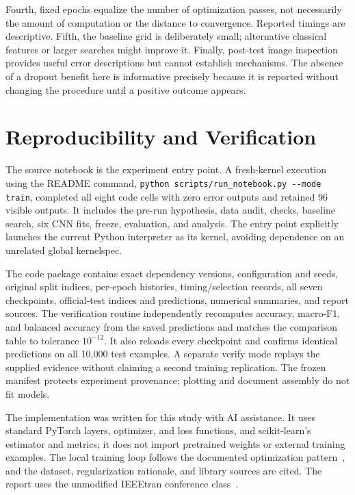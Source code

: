 \documentclass[conference]{IEEEtran}
\begin{document}
Fourth, fixed epochs equalize the number of optimization passes, not necessarily the amount of computation or the distance to convergence. Reported timings are descriptive. Fifth, the baseline grid is deliberately small; alternative classical features or larger searches might improve it. Finally, post-test image inspection provides useful error descriptions but cannot establish mechanisms. The absence of a dropout benefit here is informative precisely because it is reported without changing the procedure until a positive outcome appears.

\section{Reproducibility and Verification}
The source notebook is the experiment entry point. A fresh-kernel execution using the README command, \texttt{python scripts/run\_notebook.py -{}-mode train}, completed all eight code cells with zero error outputs and retained 96 visible outputs. It includes the pre-run hypothesis, data audit, checks, baseline search, six CNN fits, freeze, evaluation, and analysis. The entry point explicitly launches the current Python interpreter as its kernel, avoiding dependence on an unrelated global kernelspec.

The code package contains exact dependency versions, configuration and seeds, original split indices, per-epoch histories, timing/selection records, all seven checkpoints, official-test indices and predictions, numerical summaries, and report sources. The verification routine independently recomputes accuracy, macro-F1, and balanced accuracy from the saved predictions and matches the comparison table to tolerance $10^{-12}$. It also reloads every checkpoint and confirms identical predictions on all 10,000 test examples. A separate verify mode replays the supplied evidence without claiming a second training replication. The frozen manifest protects experiment provenance; plotting and document assembly do not fit models.

The implementation was written for this study with AI assistance. It uses standard PyTorch layers, optimizer, and loss functions, and scikit-learn's estimator and metrics; it does not import pretrained weights or external training examples. The local training loop follows the documented optimization pattern~\cite{pytorch}, and the dataset, regularization rationale, and library sources are cited. The report uses the unmodified IEEEtran conference class~\cite{ieeetran}.
\end{document}
